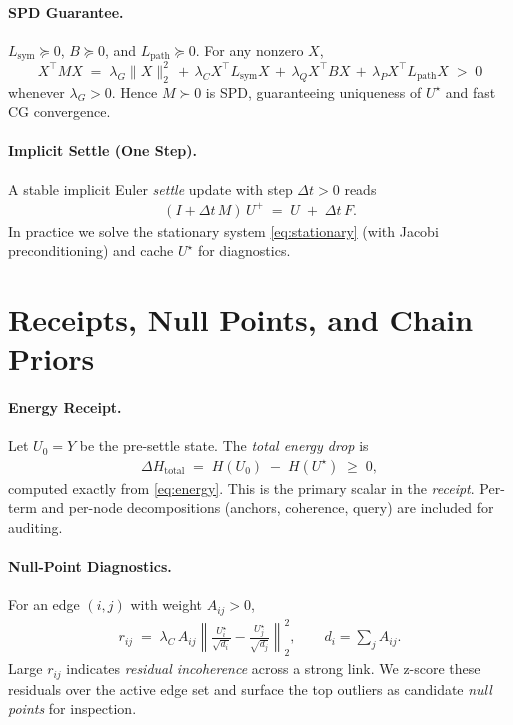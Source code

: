 \documentclass[11pt]{article}
\begin{document}
\paragraph{SPD Guarantee.}
$L_{\mathrm{sym}}\succeq 0$, $B\succeq 0$, and $L_{\mathrm{path}}\succeq 0$. For any nonzero $X$,
\[
X^\top M X \;=\; \lambda_G \|X\|_2^2 \,+\, \lambda_C X^\top L_{\mathrm{sym}}X \,+\, \lambda_Q X^\top B X \,+\, \lambda_P X^\top L_{\mathrm{path}} X \;>\; 0
\]
whenever $\lambda_G>0$. Hence $M\succ 0$ is SPD, guaranteeing uniqueness of $U^\star$ and fast CG convergence.

\paragraph{Implicit Settle (One Step).}
A stable implicit Euler \emph{settle} update with step $\Delta t>0$ reads
\begin{align}
(I + \Delta t\,M) \, U^+ \;=\; U \;+\; \Delta t \, F .
\end{align}
In practice we solve the stationary system \eqref{eq:stationary} (with Jacobi preconditioning) and cache $U^\star$ for diagnostics.

\vspace{-0.5em}
\section{Receipts, Null Points, and Chain Priors}
\paragraph{Energy Receipt.}
Let $U_0\!=\!Y$ be the pre-settle state. The \emph{total energy drop} is
\begin{align}
\Delta H_{\mathrm{total}}
\;=\;
H(U_0) \;-\; H(U^\star)
\;\ge\; 0,
\end{align}
computed exactly from \eqref{eq:energy}. This is the primary scalar in the \emph{receipt}. Per-term and per-node decompositions (anchors, coherence, query) are included for auditing.

\paragraph{Null-Point Diagnostics.}
For an edge $(i,j)$ with weight $A_{ij}\!>\!0$,
\begin{align}
r_{ij} 
\;=\;
\lambda_C \, A_{ij} 
\left\|
\frac{U^\star_i}{\sqrt{d_i}} - \frac{U^\star_j}{\sqrt{d_j}}
\right\|_2^2,
\qquad d_i = \sum_j A_{ij}.
\end{align}
Large $r_{ij}$ indicates \emph{residual incoherence} across a strong link. We z-score these residuals over the active edge set and surface the top outliers as candidate \emph{null points} for inspection.
\end{document}
